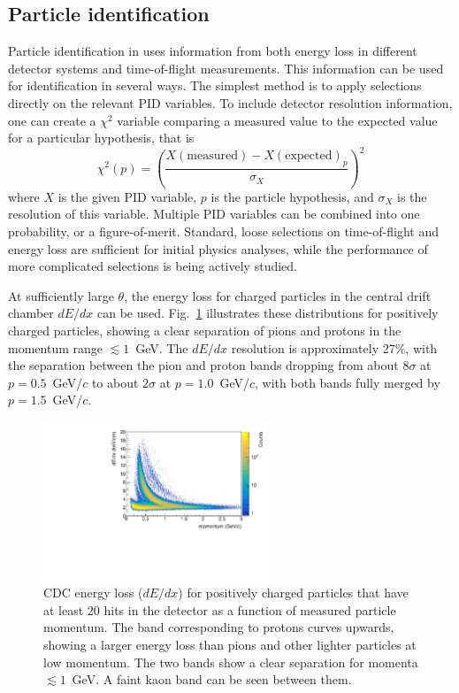 \subsection{Particle identification \label{sec:perfpid}}

Particle identification in \gx{} uses information from both energy loss in different detector systems and time-of-flight measurements.  This information can be used for identification in several ways.  The simplest method is to apply selections directly on the relevant PID variables.  To include detector resolution information, one can create a $\chi^2$ variable comparing a measured value to the expected value for a particular hypothesis, that is
\begin{equation}
    \chi^2(p) = \left(  \frac{ X(\mathrm{measured}) - X(\mathrm{expected})_p}{\sigma_X} \right)^2
\end{equation}
where $X$ is the given PID variable, $p$ is the particle hypothesis, and $\sigma_X$ is the resolution of this variable.  Multiple PID variables can be combined into one probability, or a figure-of-merit.   Standard, loose selections on time-of-flight and energy loss are sufficient for initial physics analyses, while the performance of more complicated selections is being actively studied.

At sufficiently large $\theta$, the energy loss for charged particles in the central drift chamber $dE/dx$ can be used.   Fig.~\ref{fig:performcdcdedx} illustrates these distributions for positively charged particles, showing a clear separation of pions and protons in the momentum range $\lesssim 1$~GeV. %
The $dE/dx$ resolution is approximately 27\%, with the separation between the pion and proton bands dropping from about $8\sigma$ at $p=0.5$~GeV/$c$ to about $2\sigma$ at $p=1.0$~GeV/$c$, with both bands fully merged by $p=1.5$~GeV/$c$.

\begin{figure}[tbp]
\begin{center}
\includegraphics[width=0.6\textwidth]{figures/cdc_dedx.pdf}
\caption{\label{fig:performcdcdedx}
CDC energy loss ($dE/dx$) for positively charged particles that have at least 20 hits in the detector as a function of measured particle momentum.  The band corresponding to protons curves upwards, showing a larger energy loss than pions and other lighter particles at low momentum.  The two bands show a clear separation for momenta  $\lesssim 1$~GeV.  A faint kaon band can be seen between them.
}
\end{center}
\end{figure}

